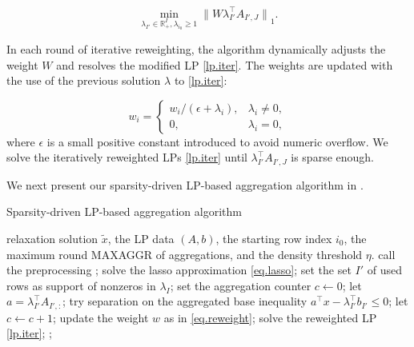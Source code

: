 \documentclass[a4paper,UKenglish,cleveref, autoref,  thm-restate]{lipics-v2021}
\newcommand{\bR}{\mathbb{R}}
\newcommand{\norm}[1]{{\lVert#1\rVert}}
\newcommand{\relx}[1]{\tilde{#1}}
\begin{document}
	
	\begin{equation}
		\label{lp.iter}
		\min_{\lambda_{I'} \in \bR^I_+, \lambda_{i_0} \ge 1}  \norm{ W \lambda_{I'}^\top A_{I',J}}_1.
	\end{equation}
	
	
	In each round of iterative reweighting, the algorithm dynamically adjusts the weight $W$ and resolves the modified LP \eqref{lp.iter}. The weights are updated with the use of the previous solution $\lambda$ to \eqref{lp.iter}:
	
	
	\begin{equation}
		\label{eq.reweight}
		w_i = \begin{cases}
			w_i / (\epsilon + \lambda_i),  &\lambda_i \ne 0,\\
			0,  & \lambda_i = 0,
		\end{cases}
	\end{equation}
	where $\epsilon$ is a small positive constant introduced to avoid numeric overflow. We solve the iteratively reweighted LPs \eqref{lp.iter} until $ \lambda_{I'}^\top A_{I',J}$ is sparse enough.
	
	
	We next present our sparsity-driven  LP-based aggregation algorithm in .
	
	
	\begin{algorithm}
		\caption{Sparsity-driven  LP-based aggregation algorithm}
		\begin{algorithmic}[1]
			\Require relaxation solution $\relx{x}$, the LP data $(A,b)$, the starting row index $i_0$,  the maximum round MAXAGGR of aggregations, and the density threshold $\eta$.
			\State call the preprocessing ;
			\State solve the lasso approximation \eqref{eq.lasso};
			\State set the set $I'$ of used rows  as support of nonzeros in $\lambda_I$;
			\State set the aggregation counter $c \leftarrow  0$;
			\State let $a = \lambda_{I'}^\top A_{I',:
			}$;
			\State try separation on the aggregated base inequality $a^\top x  - \lambda_{I'}^\top b_{I'
			}\le 0 $;
			\State  let $c \leftarrow c + 1$;
			\State update the weight $w$ as in \eqref{eq.reweight};
			\State solve the reweighted LP \eqref{lp.iter};
			\Else
			\State \Return;
			\EndIf
			\EndWhile
		\end{algorithmic}
		\label{algo.lp}
	\end{algorithm}
	
\end{document}
